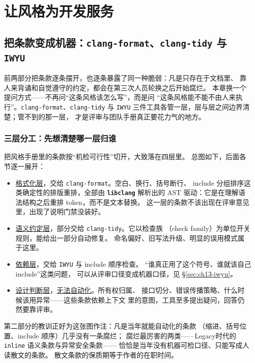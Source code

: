 \documentclass[12pt,a4paper,fontset=fandol]{ctexbook}
\newcommand{\Tp}[1]{\texttt{#1}}
\newcommand{\Bk}{\discretionary{}{}{}}
\newcommand{\Lib}[1]{\textbf{\texttt{#1}}}
\newcommand{\Lang}[1]{\textsf{#1}}
\newcommand{\DomTra}{\Lang{Legacy}}
\begin{document}
\part{让风格为开发服务}

\chapter{把条款变成机器：\Tp{clang-{\Bk}format}、\Tp{clang-{\Bk}tidy} 与 \Tp{IWYU}}
\label{ch:ch13-tools}

前两部分把条款逐条摆开，也逐条暴露了同一种脆弱：凡是只存在于文档里、
靠人来背诵和自觉遵守的约定，都会在第三次人员轮换之后开始腐烂。
本章换一个提问方式——不再问``这条风格该怎么写''，而是问
``这条风格能不能不由人来执行''。\Tp{clang-format}、\Tp{clang-tidy} 与
\Tp{IWYU} 三件工具各管一层，层与层之间边界清楚；管不到的那一层，
才是评审与团队手册真正要花力气的地方。

\section{三层分工：先想清楚哪一层归谁}
\label{sec:ch13-layers}

把风格手册里的条款按``机检可行性''切开，大致落在四层里。
总图如下，后面各节逐一展开：

\begin{itemize}
  \item \underline{格式化层}，交给 \Tp{clang-format}。空白、换行、括号断行、
        include 分组排序这类确定性的排版重排，全部由 \Lib{libclang} 解析出的
        AST 驱动：它是在理解语法结构之后重排 token，而不是文本替换。
        这一层的条款不该出现在评审意见里，出现了说明门禁没装好。
  \item \underline{语义约定层}，部分交给 \Tp{clang-tidy}。它以检查族
        （check family）为单位开关规则，能给出一部分自动修复。
        命名偏好、旧写法升级、明显的误用模式属于这里。
  \item \underline{依赖层}，交给 \Tp{IWYU} 与 include 顺序检查。
        ``谁真正用了这个符号、谁就该自己 include''这类问题，
        可以从评审口径变成机器口径，见 \S\ref{sec:ch13-iwyu}。
  \item \underline{设计判断层}，\underline{无法自动化}。所有权归属、
        接口切分、错误传播策略、什么时候该用异常——这些条款依赖上下文
        里的意图，工具至多提出疑问，回答仍然要靠评审。
\end{itemize}

第二部分的教训正好为这张图作注：凡是当年就能自动化的条款
（缩进、括号位置、include 顺序）几乎没有一条腐烂；
腐烂最厉害的两类——\DomTra 时代的 \Tp{inline} 语义条款与异常安全条款——
恰恰是当年没有机器可检口径、只能写成人读散文的条款。
散文条款的保质期等于作者的在职时间。
\end{document}
